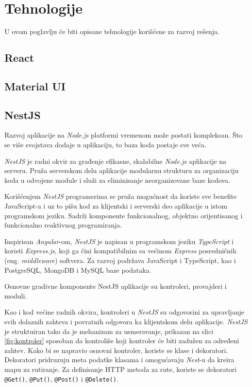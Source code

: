 \chapter{Tehnologije}\label{ch:tehnologije}

U ovom poglavlju će biti opisane tehnologije korišćene za razvoj rešenja.

\section{React}\label{sec:react}

\section{Material UI}\label{sec:material_ui}

\section{NestJS}\label{sec:nestjs}
Razvoj aplikacije na \textit{Node.js} platformi vremenom može postati kompleksan. Što se više svojstava 
dodaje u aplikaciju, to baza koda postaje sve veća.

\textit{NestJS} je radni okvir za građenje efikasne, skalabilne \textit{Node.js} aplikacije na serveru. 
Pruža serverskom delu aplikacije modularnu strukturu za organizaciju koda u odvojene module i služi 
za eliminisanje neorganizovane baze kodova.

Korišćenjem \textit{NestJS} programerima se pruža mogućnost da koriste sve benefite JavaScript-a i uz
to pišu kod za klijentski i serverski deo aplikacije u istom programskom jeziku. Sadrži komponente 
funkcionalnog, objektno orijentisanog i funkcionalno reaktivnog programiranja.

Inspirisan \textit{Angular}-om, \textit{NestJS} je napisan u programskom jeziku \textit{TypeScript} 
i koristi \textit{Express.js}, koji ga čini kompatibilnim sa većinom \textit{Express} posredničnih 
(eng. \textit{middleware}) softvera. Za razvoj podržava JavaScript i TypeScript, kao i PostgreSQL, 
MongoDB i MySQL baze podataka.

Osnovne gradivne komponente NestJS aplikacije su kontroleri, provajderi i moduli.

Kao i kod većine radnih okvira, kontroleri u \textit{NestJS} su odgovorini za upravljanje svih dolaznih 
zahteva i povratnih odgovora ka klijentskom delu aplikacije. \textit{NestJS} je struktuiran tako da je 
mehanizam za usmeravanje, prikazan na slici \ref{fig:kontroler} sposoban da kontroliše koji kontroler 
će biti zadužen za određeni zahtev.
Kako bi se napravio osnovni kontroler, koriste se klase i dekoratori. Dekoratori pridruzuju meta 
podatke klasama i omogućavaju \textit{Nest}-u da kreira mapu za rutiranje. Za definisanje HTTP 
metoda za rute, koriste se dekoratori \texttt{@Get()}, \texttt{@Put()}, \texttt{@Post()} i \texttt{@Delete()}.~\cite{nest}

